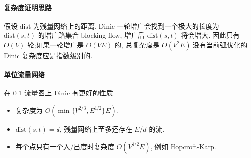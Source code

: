 \begin{small}
\paragraph{复杂度证明思路}
假设 $\mathrm{dist}$ 为残量网络上的距离.
Dinic 一轮增广会找到一个极大的长度为 $\mathrm{dist} (s, t)$ 的增广路集合 blocking flow, 增广后 $\mathrm{dist} (s, t)$ 将会增大.
因此只有 $O(V)$ 轮;如果一轮增广是 $O(VE)$ 的,
总复杂度是 $O(V^2E)$.没有当前弧优化的 Dinic 复杂度应是指数级别的.

\paragraph{单位流量网络}
在 0-1 流量图上 Dinic 有更好的性质. 
\begin{itemize}
	\setlength{\itemsep}{0pt}
	\setlength{\parskip}{0pt}
	\setlength{\parsep}{0pt}
	\item 复杂度为 $O(\min \{V ^ {2/3}, E ^ {1/2}\} E)$.
	\item $\mathrm{dist} (s, t) = d$, 残量网络上至多还存在 $E/d$ 的流.
	\item 每个点只有一个入/出度时复杂度 $O(V ^ {1 /2 } E)$, 例如 Hopcroft-Karp.
\end{itemize}
\end{small}